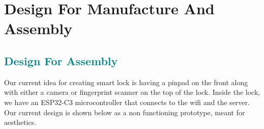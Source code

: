 \section{Design For Manufacture And Assembly}

\textcolor{teal}{\subsection{Design For Assembly}}

Our current idea for creating smart lock is having a pinpad on the front along with either a camera or fingerprint scanner on the top of the lock. Inside the lock, we have an ESP32-C3 microcontroller that connects to the wifi and the server. Our current design is shown below as a non functioning prototype, meant for aesthetics.

